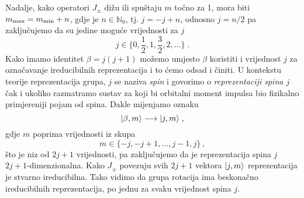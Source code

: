 Nadalje, kako operatori $J_\pm$ dižu ili spuštaju $m$ točno za 1, mora
biti $m_{\textrm{\scriptsize max}} = m_{\textrm{\scriptsize min}} +n $,
gdje je $n\in \mathbb{N}_{0}$, tj. $j = -j +n$, odnosno $j=n/2$ pa
zaključujemo da su jedine moguće vrijednosti za $j$
\begin{displaymath}
    j \in \{ 0, \frac{1}{2}, 1, \frac{3}{2}, 2, \ldots \}\;.
\end{displaymath}
Kako imamo identitet $\beta = j(j+1)$ možemo umjesto $\beta$ koristiti
i vrijednost $j$ za označavanje ireducibilnih reprezentacija i to ćemo
odsad i činiti. U kontekstu teorije reprezentacija grupa, $j$ se naziva
\emph{spin} i govorimo o \emph{reprezentaciji spina $j$} čak i ukoliko
razmatramo sustav za koji bi orbitalni moment impulsa
bio fizikalno primjereniji pojam od spina.
Dakle mijenjamo oznaku
\begin{displaymath}
  | \beta, m \rangle \longrightarrow | j, m \rangle \;,
\end{displaymath}
gdje $m$ poprima vrijednosti iz skupa
\begin{displaymath}
    m \in \{ -j, -j+1, \ldots, j-1, j\} \,,
\end{displaymath}
što je niz od $2j+1$ vrijednosti, pa zaključujemo da je
reprezentacija spina $j$  $2j+1$-dimenzionalna.
Kako $J_{\pm}$ povezuju svih $2j+1$ vektora $| j, m \rangle$ 
reprezentacija je stvarno ireducibilna.
Tako vidimo da grupa rotacija ima beskonačno ireducibilnih
reprezentacija, po jednu za svaku vrijednost spina $j$.

